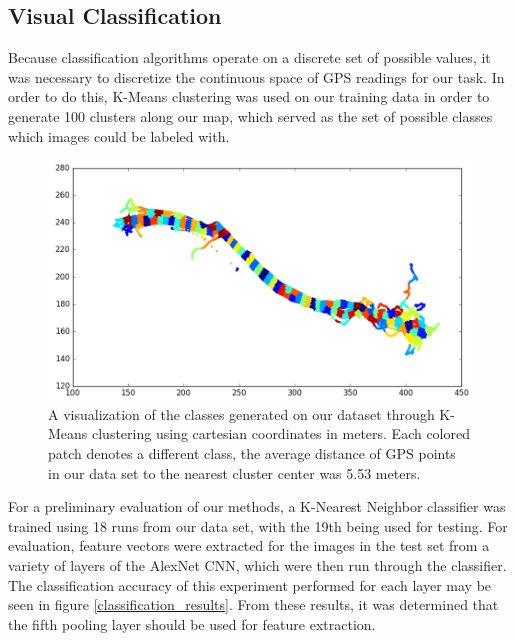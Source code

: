 \documentclass[letterpaper, 12 pt, conference]{ieeeconf}  %
\begin{document}
\subsection{Visual Classification}

Because classification algorithms operate on a discrete set of possible values, it was necessary to discretize the continuous space of GPS readings for our task. In order to do this, K-Means clustering \cite{alsabti1997efficient} was used on our training data in order to generate 100 clusters along our map, which served as the set of possible classes which images could be labeled with. 
\par 

\begin{figure}[h]
\centering
\includegraphics[scale=0.95]{clustering}
\caption{A visualization of the classes generated on our dataset through K-Means clustering using cartesian coordinates in meters. Each colored patch denotes a different class, the average distance of GPS points in our data set to the nearest cluster center was 5.53 meters.}
\label{clustering}
\end{figure}

For a preliminary evaluation of our methods, a K-Nearest Neighbor classifier was trained using 18 runs from our data set, with the 19th being used for testing. For evaluation, feature vectors were extracted for the images in the test set from a variety of layers of the AlexNet CNN, which were then run through the classifier. The classification accuracy of this experiment performed for each layer may be seen in figure \ref{classification_results}. From these results, it was determined that the fifth pooling layer should be used for feature extraction.  
\end{document}
